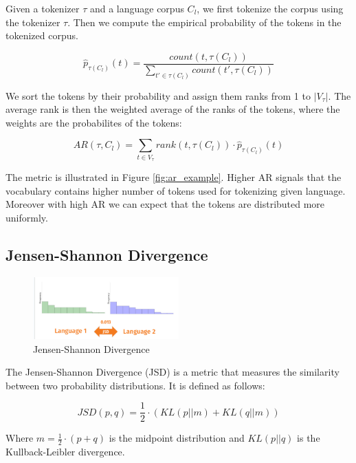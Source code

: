 Given a tokenizer $\tau$ and a language corpus $C_l$, we first tokenize the corpus using the tokenizer $\tau$. Then we compute the empirical probability of the tokens in the tokenized corpus.

\begin{equation}
    \hat{p}_{\tau(C_l)}(t) = \frac{count(t, \tau(C_l))}{\sum_{t' \in \tau(C_l)} count(t', \tau(C_l))}
\end{equation}

We sort the tokens by their probability and assign them ranks from 1 to $|V_\tau|$. The average rank is then the weighted average of the ranks of the tokens, where the weights are the probabilites of the tokens:

\begin{equation}
    AR(\tau, C_l) = \sum_{t \in V_\tau} rank(t, \tau(C_l)) \cdot \hat{p}_{\tau(C_l)}(t)
\end{equation}

The metric is illustrated in Figure \ref{fig:ar_example}. Higher AR signals that the vocabulary contains higher number of tokens used for tokenizing given language. Moreover with high AR we can expect that the tokens are distributed more uniformly.

\subsection{Jensen-Shannon Divergence}

\begin{figure}[h]
    \centering
    \includegraphics[width=0.5\textwidth]{img/temp/jsd_example.png}
    \caption{Jensen-Shannon Divergence}
    \label{fig:jsd_example}
\end{figure}

The Jensen-Shannon Divergence (JSD) is a metric that measures the similarity between two probability distributions. It is defined as follows:

\begin{equation}
    JSD(p, q) = \frac{1}{2} \cdot (KL(p||m) + KL(q||m))
\end{equation}

Where $m = \frac{1}{2} \cdot (p + q)$ is the midpoint distribution and $KL(p||q)$ is the Kullback-Leibler divergence. 


